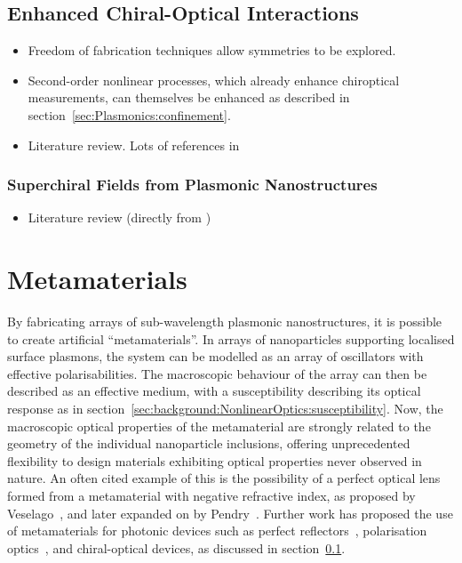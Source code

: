 \subsection{Enhanced Chiral-Optical Interactions} \label{sec:background:Plasmonics:chiralPlasmonics}
\begin{itemize}
    \item Freedom of fabrication techniques allow symmetries to be explored.
    \item Second-order nonlinear processes, which already enhance chiroptical measurements, can themselves be enhanced as described in section~\ref{sec:Plasmonics:confinement}.
    \item Literature review. Lots of references in~\cite[\S 3.2]{Collins2017}
\end{itemize}

\subsubsection{Superchiral Fields from Plasmonic Nanostructures}
\begin{itemize}
    \item Literature review (directly from \cite[\S 4.3]{Collins2017})
\end{itemize}

\section{Metamaterials}
By fabricating arrays of sub-wavelength plasmonic nanostructures, it is possible to create artificial ``metamaterials''. In arrays of nanoparticles supporting localised surface plasmons, the system can be modelled as an array of oscillators with effective polarisabilities. The macroscopic behaviour of the array can then be described as an effective medium, with a susceptibility describing its optical response as in section~\ref{sec:background:NonlinearOptics:susceptibility}. Now, the macroscopic optical properties of the metamaterial are strongly related to the geometry of the individual nanoparticle inclusions, offering unprecedented flexibility to design materials exhibiting optical properties never observed in nature. An often cited example of this is the possibility of a perfect optical lens formed from a metamaterial with negative refractive index, as proposed by Veselago~\cite{Veselago1968}, and later expanded on by Pendry~\cite{Pendry2000}. Further work has proposed the use of metamaterials for photonic devices such as perfect reflectors~\cite{Moitra2015}, polarisation optics~\cite{Cong2015}, and chiral-optical devices, as discussed in section~\ref{sec:background:Plasmonics:chiralPlasmonics}.


